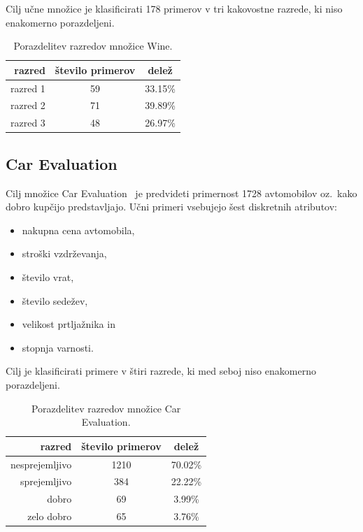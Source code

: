 \documentclass[a4paper,12pt,openright]{book}
\begin{document}
    Cilj učne množice je klasificirati 178 primerov v tri kakovostne razrede, ki niso enakomerno porazdeljeni.

    \begin{table}[H]
        \centering
        \begin{tabular}{||rcc||}
            \hline
            razred  & število primerov & delež   \\ \hline
            razred 1 & 59               & 33.15\% \\ \hline
            razred 2 & 71               & 39.89\% \\ \hline
            razred 3 & 48               & 26.97\% \\ \hline
        \end{tabular}
        \caption{Porazdelitev razredov množice Wine.}
        \label{tab:wine_opis}
    \end{table}

    \subsection{Car Evaluation}\label{subsec:car-evaluation}
    Cilj množice Car Evaluation~\cite{misc_car_evaluation_19} je predvideti primernost 1728 avtomobilov oz.\ kako dobro kupčijo predstavljajo.
    Učni primeri vsebujejo šest diskretnih atributov:
    \begin{itemize}
        \item nakupna cena avtomobila,
        \item stroški vzdrževanja,
        \item število vrat,
        \item število sedežev,
        \item velikost prtljažnika in
        \item stopnja varnosti.
    \end{itemize}

    Cilj je klasificirati primere v štiri razrede, ki med seboj niso enakomerno porazdeljeni.

    \begin{table}[H]
        \centering
        \begin{tabular}{||rcc||}
            \hline
            razred         & število primerov & delež   \\ \hline
            nesprejemljivo & 1210             & 70.02\% \\ \hline
            sprejemljivo   & 384              & 22.22\% \\ \hline
            dobro          & 69               & 3.99\%  \\ \hline
            zelo dobro     & 65               & 3.76\%  \\ \hline
        \end{tabular}
        \caption{Porazdelitev razredov množice Car Evaluation.}
        \label{tab:car_opis}
    \end{table}
\end{document}
